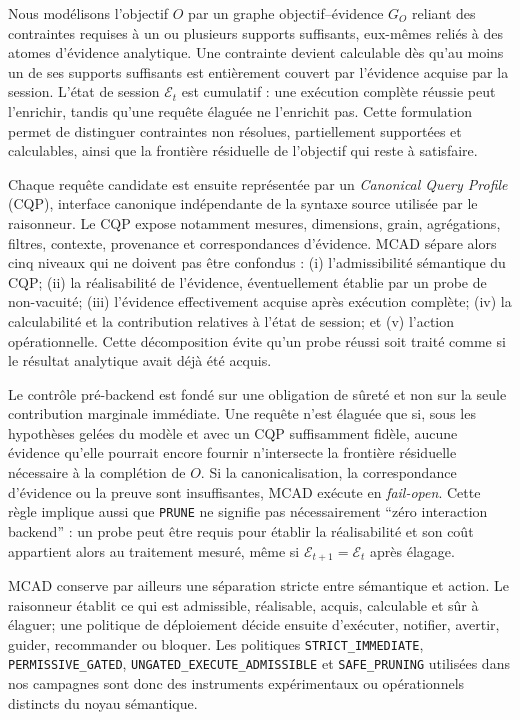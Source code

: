 \documentclass[journal]{IEEEtran}
\begin{document}
Nous modélisons l'objectif $O$ par un graphe objectif--évidence $G_O$ reliant des contraintes requises à un ou plusieurs supports suffisants, eux-mêmes reliés à des atomes d'évidence analytique. Une contrainte devient calculable dès qu'au moins un de ses supports suffisants est entièrement couvert par l'évidence acquise par la session. L'état de session $\mathcal{E}_t$ est cumulatif : une exécution complète réussie peut l'enrichir, tandis qu'une requête élaguée ne l'enrichit pas. Cette formulation permet de distinguer contraintes non résolues, partiellement supportées et calculables, ainsi que la frontière résiduelle de l'objectif qui reste à satisfaire.

Chaque requête candidate est ensuite représentée par un \emph{Canonical Query Profile} (CQP), interface canonique indépendante de la syntaxe source utilisée par le raisonneur. Le CQP expose notamment mesures, dimensions, grain, agrégations, filtres, contexte, provenance et correspondances d'évidence. MCAD sépare alors cinq niveaux qui ne doivent pas être confondus : (i) l'admissibilité sémantique du CQP; (ii) la réalisabilité de l'évidence, éventuellement établie par un probe de non-vacuité; (iii) l'évidence effectivement acquise après exécution complète; (iv) la calculabilité et la contribution relatives à l'état de session; et (v) l'action opérationnelle. Cette décomposition évite qu'un probe réussi soit traité comme si le résultat analytique avait déjà été acquis.

Le contrôle pré-backend est fondé sur une obligation de sûreté et non sur la seule contribution marginale immédiate. Une requête n'est élaguée que si, sous les hypothèses gelées du modèle et avec un CQP suffisamment fidèle, aucune évidence qu'elle pourrait encore fournir n'intersecte la frontière résiduelle nécessaire à la complétion de $O$. Si la canonicalisation, la correspondance d'évidence ou la preuve sont insuffisantes, MCAD exécute en \emph{fail-open}. Cette règle implique aussi que \texttt{PRUNE} ne signifie pas nécessairement ``zéro interaction backend'' : un probe peut être requis pour établir la réalisabilité et son coût appartient alors au traitement mesuré, même si $\mathcal{E}_{t+1}=\mathcal{E}_t$ après élagage.

MCAD conserve par ailleurs une séparation stricte entre sémantique et action. Le raisonneur établit ce qui est admissible, réalisable, acquis, calculable et sûr à élaguer; une politique de déploiement décide ensuite d'exécuter, notifier, avertir, guider, recommander ou bloquer. Les politiques \texttt{STRICT\_IMMEDIATE}, \texttt{PERMISSIVE\_GATED}, \texttt{UNGATED\_EXECUTE\_ADMISSIBLE} et \texttt{SAFE\_PRUNING} utilisées dans nos campagnes sont donc des instruments expérimentaux ou opérationnels distincts du noyau sémantique.
\end{document}
